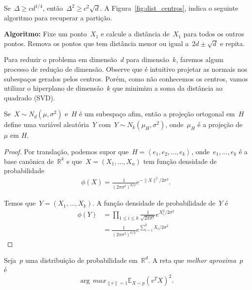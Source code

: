 Se~$\Delta \geq cd^{1/4}$, então~$\Delta^{2} \geq c^{2}\sqrt{d}$. A
Figura~\ref{fig:dist_centros}, indica o seguinte algoritmo para
recuperar a partição.

\textbf{Algoritmo:} Fixe um ponto~$X_{1}$ e calcule a distância
de~$X_{1}$ para todos os outros pontos. Remova os pontos que tem
distância menor ou igual a~$2d \pm \sqrt{d}$ e repita.

Para reduzir o problema em dimensão~$d$ para dimensão~$k$, faremos
algum processo de redução de dimensão. Observe que é intuitivo
projetar as normais nos subespaços gerados pelos centros. Porém, como
não conhecemos os centros, vamos utilizar o hiperplano de dimensão~$k$
que minimiza a soma da distância ao quadrado (SVD).

\begin{fato}
  Se~$X \sim N_{d}(\mu, \sigma^{2})$ e~$H$ é um subespaço afim, então
  a projeção ortogonal em~$H$ define uma variável aleatória~$Y$
  com~$Y \sim N_{k}(\mu_{H}, \sigma^{2})$, onde~$\mu_{H}$ é a projeção
  de~$\mu$ em $H$.
\end{fato}

\begin{proof}
  Por translação, podemos supor
  que~$H=\left<e_{1},e_{2},\dots,e_{k}\right>$,
  onde~$e_{1},\dots,e_{k}$ é a base canônica de~$\mathbb{R}^{k}$ e
  que~$X=(X_{1},\dots,X_{n})$ tem função densidade de probabilidade
  \begin{align*}
    \phi(X)=\frac{1}{\left(2\pi\sigma^{2}\right)^{d/2}}e^{-\lVert X \rVert^{2}/2\sigma^{2}}.
  \end{align*}

  Temos que~$Y=(X_{1},\dots,X_{k})$. A função densidade de
  probabilidade de~$Y$ é
  \begin{align*}
    \phi(Y)&=\prod_{1 \leq i \leq k}\frac{1}{\sqrt{2\pi\sigma^{2}}}e^{X_{i}^{2}/2\sigma^{2}}\\
           &=\frac{1}{\left(2\pi\sigma^{2}\right)^{k/2}}e^{\sum_{i=1}^{k}X_{i}/2\sigma^{2}}
  \end{align*}

\end{proof}

Seja~$p$ uma distribuição de probabilidade em~$\mathbb{R}^{d}$. A reta
que \emph{melhor aproxima~$p$} é
$$\arg\,max_{\lVert v \rVert=1}\mathbb{E}_{X \sim p}(v^{T}X)^2.$$
